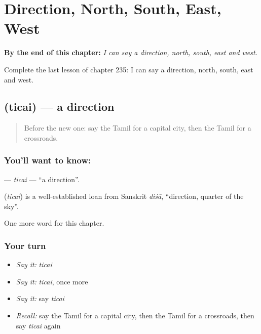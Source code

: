 
\chapter{Direction, North, South, East, West}
\label{ch:ta-direction-north-south-east-west}

\begin{chapteropening}
\textbf{By the end of this chapter:} \emph{I can say a direction, north, south, east and west.}

Complete the last lesson of chapter 235: I can say a direction, north, south, east and west.
\end{chapteropening}

\section[\texorpdfstring{\ta{திசை} (ticai)}{திசை (ticai)}]{ (ticai) — a direction}

\label{lesson:TA-C235-ticai}



\begin{quote}
Before the new one: say the Tamil for a capital city, then the Tamil for a crossroads.
\end{quote}

\subsection*{You'll want to know: }
\textbf{} — \emph{ticai} — \textquotedblleft{}a direction\textquotedblright{}.

\begin{cousinweb}
\textbf{} (\emph{ticai}) is a well-established loan from Sanskrit \emph{diśā}, \textquotedblleft{}direction, quarter of the sky\textquotedblright{}.
\end{cousinweb}

\begin{grammarlens}[title={What you've built}]
One more word for this chapter.
\end{grammarlens}

\subsection*{Your turn}
\begin{itemize}
\raggedright
  \item \emph{Say it:} \emph{ticai}
  \item \emph{Say it:} \emph{ticai}, once more
  \item \emph{Say it:} say \emph{ticai}
  \item \emph{Recall:} say the Tamil for a capital city, then the Tamil for a crossroads, then say \emph{ticai} again
\end{itemize}

